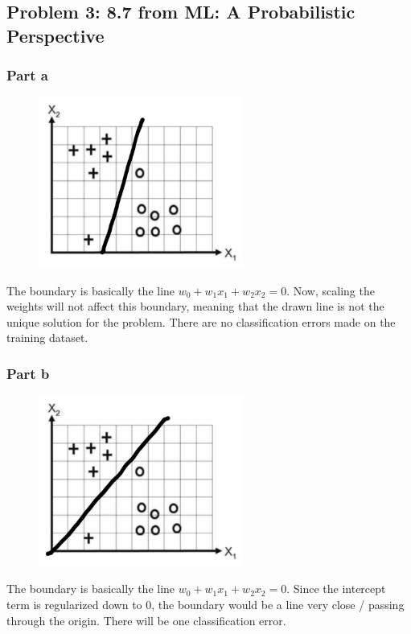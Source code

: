 \documentclass{article}
\begin{document}
\subsection*{Problem 3: 8.7 from ML: A Probabilistic Perspective}
\subsubsection*{Part a}
\begin{minipage}{0.475\linewidth}
\begin{figure}[H]
\centering
\includegraphics[width=0.6\textwidth]{./images/8_7_a.jpg}
\end{figure}
\end{minipage}
\hfill
\begin{minipage}{0.475\linewidth}
The boundary is basically the line \(w_{0} + w_{1}x_{1} + w_{2}x_{2} = 0\). Now, scaling the weights will not affect this boundary, meaning that the drawn line is not the unique solution for the problem. There are no classification errors made on the training dataset.
\end{minipage}

\subsubsection*{Part b}
\begin{minipage}{0.475\linewidth}
\begin{figure}[H]
\centering
\includegraphics[width=0.6\textwidth]{./images/8_7_b.jpg}
\end{figure}
\end{minipage}
\hfill
\begin{minipage}{0.475\linewidth}
The boundary is basically the line \(w_{0} + w_{1}x_{1} + w_{2}x_{2} = 0\). Since the intercept term is regularized down to 0, the boundary would be a line very close / passing through the origin. There will be one classification error.
\end{minipage}
\end{document}
